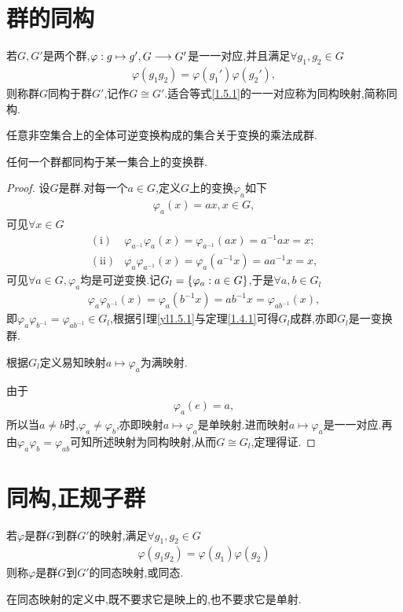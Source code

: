 \section{群的同构}
\begin{definition}[群的同构]
    若$G,G'$是两个群,$\varphi:g\mapsto g',G\longrightarrow G'$是一一对应,并且满足$\forall g_1,g_2\in G$\begin{align}
        \varphi(g_1g_2)=\varphi(g_1')\varphi(g_2'),\label{1.5.1}
    \end{align}则称群$G$同构于群$G'$,记作$G\cong G'$.适合等式\eqref{1.5.1}的一一对应称为同构映射,简称同构.
\end{definition}
\begin{lemma}\label{yl1.5.1}
    任意非空集合上的全体可逆变换构成的集合关于变换的乘法成群.
\end{lemma}
\begin{theorem}[Cayley定理]
    任何一个群都同构于某一集合上的变换群.
\end{theorem}
\begin{proof}
    设$G$是群.对每一个$a\in G$,定义$G$上的变换$\varphi_a$如下\begin{align*}
        \varphi_a(x)=ax,x\in G,
    \end{align*}可见$\forall x\in G$\begin{align*}
        (\text{i})&\varphi_{a^{-1}}\varphi_a(x)=\varphi_{a^{-1}}(ax)=a^{-1}ax=x;\\
        (\text{ii})&\varphi_a\varphi_{a^{-1}}(x)=\varphi_a(a^{-1}x)=aa^{-1}x=x,
    \end{align*}可见$\forall a\in G,\varphi_a$均是可逆变换.记$G_l=\left\{\varphi_a:a\in G\right\}$,于是$\forall a,b\in G_l$\begin{align*}
        \varphi_a\varphi_{b^{-1}}(x)=\varphi_a(b^{-1}x)=ab^{-1}x=\varphi_{ab^{-1}}(x),
    \end{align*}即$\varphi_a\varphi_{b^{-1}}=\varphi_{ab^{-1}}\in G_l$,根据引理\ref{yl1.5.1}与定理\ref{1.4.1}可得$G_l$成群,亦即$G_l$是一变换群.

    根据$G_l$定义易知映射$a\mapsto\varphi_a$为满映射.
    
    由于\begin{align*}
        \varphi_a(e)=a,
    \end{align*}所以当$a\neq b$时,$\varphi_a\neq\varphi_b$,亦即映射$a\mapsto\varphi_a$是单映射.进而映射$a\mapsto\varphi_a$是一一对应.再由$\varphi_a\varphi_b=\varphi_{ab}$可知所述映射为同构映射,从而$G\cong G_l$,定理得证.
\end{proof}
\section{同构,正规子群}
\begin{definition}[同态映射]
    若$\varphi$是群$G$到群$G'$的映射,满足$\forall g_1,g_2\in G$\begin{align*}
        \varphi(g_1g_2)=\varphi(g_1)\varphi(g_2)
    \end{align*}则称$\varphi$是群$G$到$G'$的同态映射,或同态.
\end{definition}
\begin{remark}
    在同态映射的定义中,既不要求它是映上的,也不要求它是单射.
\end{remark}

